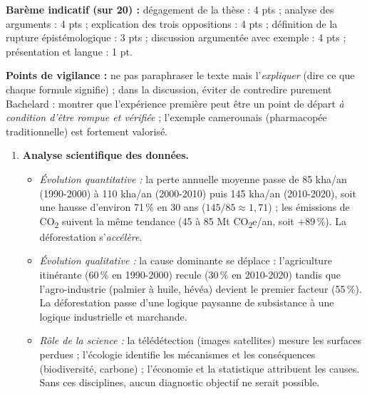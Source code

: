 \documentclass[11pt]{article}
\newcommand{\cle}[1]{{\popxbold\color{popdark}#1}}
\begin{document}
\begin{corrige}
\begin{enumerate}
\end{enumerate}
\textbf{Barème indicatif (sur 20) :} dégagement de la thèse : 4 pts ; analyse des arguments : 4 pts ; explication des trois oppositions : 4 pts ; définition de la rupture épistémologique : 3 pts ; discussion argumentée avec exemple : 4 pts ; présentation et langue : 1 pt.

\textbf{Points de vigilance :} ne pas paraphraser le texte mais l'\emph{expliquer} (dire ce que chaque formule signifie) ; dans la discussion, éviter de contredire purement Bachelard : montrer que l'expérience première peut être un point de départ \emph{à condition d'être rompue et vérifiée} ; l'exemple camerounais (pharmacopée traditionnelle) est fortement valorisé.
\end{corrige}

\begin{corrige}
\begin{enumerate}
    \item \textbf{Analyse scientifique des données.}
    \begin{itemize}
        \item \emph{Évolution quantitative :} la perte annuelle moyenne passe de \num{85} kha/an (1990-2000) à \num{110} kha/an (2000-2010) puis \num{145} kha/an (2010-2020), soit une hausse d'environ \num{71}\,\% en 30 ans ($145/85 \approx 1,71$) ; les émissions de CO\textsubscript{2} suivent la même tendance (\num{45} à \num{85} Mt CO\textsubscript{2}e/an, soit $+\num{89}\,\%$). La déforestation s'\emph{accélère}.
        \item \emph{Évolution qualitative :} la cause dominante se déplace : l'agriculture itinérante (\num{60}\,\% en 1990-2000) recule (\num{30}\,\% en 2010-2020) tandis que l'\cle{agro-industrie} (palmier à huile, hévéa) devient le premier facteur (\num{55}\,\%). La déforestation passe d'une logique paysanne de subsistance à une logique industrielle et marchande.
        \item \emph{Rôle de la science :} la \cle{télédétection} (images satellites) mesure les surfaces perdues ; l'\cle{écologie} identifie les mécanismes et les conséquences (biodiversité, carbone) ; l'\cle{économie} et la statistique attribuent les causes. Sans ces disciplines, aucun diagnostic objectif ne serait possible.
    \end{itemize}

\end{enumerate}
\end{corrige}
\end{document}
